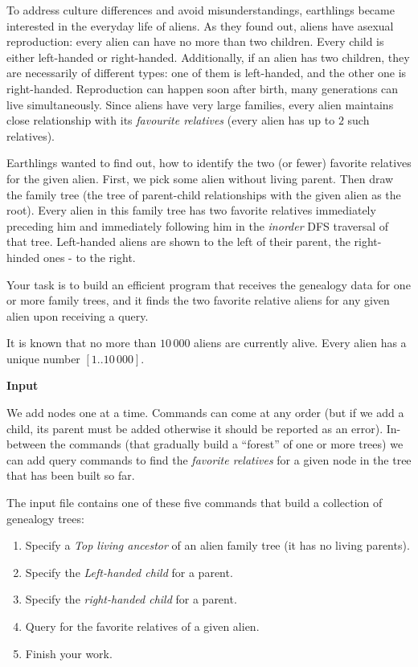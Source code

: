 \documentclass[11pt]{article}
\begin{document}
To address culture differences and avoid misunderstandings, earthlings became interested 
in the everyday life of aliens. As they found out, aliens have asexual reproduction: 
every alien can have no more than two children. Every child is either left-handed or right-handed. 
Additionally, if an alien has two children, they are necessarily of different types: one of them is left-handed, 
and the other one is right-handed. Reproduction can happen soon after birth, 
many generations can live simultaneously. Since aliens have very large families, 
every alien maintains close relationship with its {\em favourite relatives} (every alien 
has up to $2$ such relatives). 

Earthlings wanted to find out, how to identify the two (or fewer) favorite relatives for the given alien. 
First, we pick some alien without living parent. Then draw the family tree 
(the tree of parent-child relationships with the given alien as the root).  
Every alien in this family tree has two favorite relatives immediately preceding him and 
immediately following him in the {\em inorder} DFS traversal of that tree. 
Left-handed aliens are shown to the left of their parent, the right-hinded ones - to the right. 

Your task is to build an efficient program that receives the genealogy data for 
one or more family trees, and it finds the two favorite relative aliens for any given alien upon 
receiving a query.

It is known that no more than $10\,000$ aliens are currently alive. 
Every alien has a unique number $[1..10\,000]$.


\vspace{20pt}
{\bf Input}

We add nodes one at a time. Commands can come at any order 
(but if we add a child, its parent must be added \textendash{} 
otherwise it should be reported as an error). 
In-between the commands (that gradually build a ``forest'' of one or more trees) we 
can add query commands to find the {\em favorite relatives} for a given node 
in the tree that has been built so far. 

The input file contains one of these five commands that build 
a collection of genealogy trees:

\begin{enumerate}
\item Specify a {\em Top living ancestor} of an alien family tree (it has no living parents). 
\item Specify the {\em Left-handed child} for a parent. 
\item Specify the {\em right-handed child} for a parent. 
\item Query for the favorite relatives of a given alien. 
\item Finish your work. 
\end{enumerate}
\end{document}
